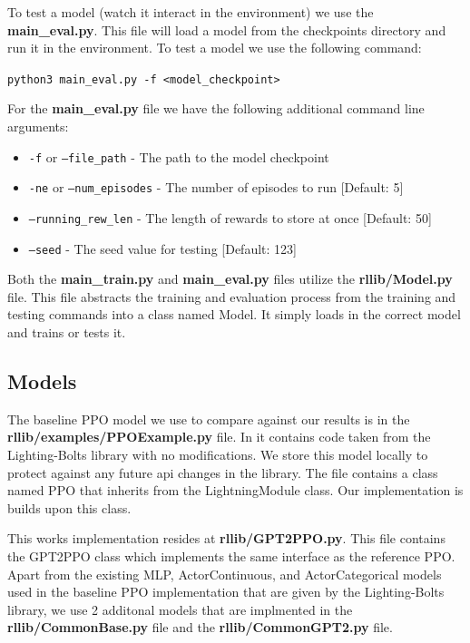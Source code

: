 To test a model (watch it interact in the environment) we use the \textbf{main\_eval.py}. This file will load a model from the checkpoints directory and 
run it in the environment.
To test a model we use the following command:
\begin{center}
    \texttt{python3 main\_eval.py -f <model\_checkpoint>}
\end{center}

For the \textbf{main\_eval.py} file we have the following additional command line arguments:
\begin{itemize}
    \item \texttt{-f} or \texttt{--file\_path} - The path to the model checkpoint
    \item \texttt{-ne} or \texttt{--num\_episodes} - The number of episodes to run [Default: 5]
    \item \texttt{--running\_rew\_len} - The length of rewards to store at once [Default: 50]
    \item \texttt{--seed} - The seed value for testing [Default: 123]
\end{itemize}

Both the \textbf{main\_train.py} and \textbf{main\_eval.py} files utilize the \textbf{rllib/Model.py} file. 
This file abstracts the training and evaluation process from the training and testing commands into a class named Model. 
It simply loads in the correct model and trains or tests it.

\subsection{Models}

The baseline PPO model we use to compare against our results is in the \textbf{rllib/examples/PPOExample.py} file.
In it contains code taken from the Lighting-Bolts library with no modifications. We store this model locally to protect against 
any future api changes in the library. The file contains a class named PPO that inherits from the LightningModule class.
Our implementation is builds upon this class.

This works implementation resides at \textbf{rllib/GPT2PPO.py}. This file contains the GPT2PPO class which implements the same interface as
the reference PPO. Apart from the existing MLP, ActorContinuous, and ActorCategorical models used in the baseline PPO implementation that are  
given by the Lighting-Bolts library, we use 2 additonal models that are implmented in the \textbf{rllib/CommonBase.py} file and 
the \textbf{rllib/CommonGPT2.py} file.

